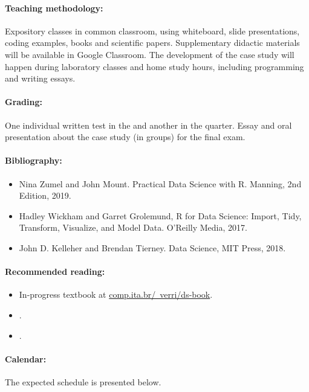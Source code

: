 \paragraph{Teaching methodology:}
Expository classes in common classroom, using whiteboard, slide presentations, coding
examples, books and scientific papers. Supplementary didactic materials will be available
in Google Classroom. The development of the case study will happen during laboratory
classes and home study hours, including programming and writing essays.

\paragraph{Grading:} One individual written test in the  and another in the  quarter.
Essay and oral presentation about the case study (in groups) for the final exam.

\newpage
\paragraph{Bibliography:}
\begin{itemize}
  \item Nina Zumel and John Mount. Practical Data Science with R. Manning, 2nd Edition, 2019.
  \item Hadley Wickham and Garret Grolemund, R for Data Science: Import, Tidy, Transform, Visualize, and Model Data. O’Reilly Media, 2017.
  \item John D. Kelleher and Brendan Tierney. Data Science, MIT Press, 2018.
\end{itemize}

\thispagestyle{empty}
\paragraph{Recommended reading:}
\begin{itemize}
  \item In-progress textbook at \href{https://comp.ita.br/~verri/ds-book}{comp.ita.br/~verri/ds-book}.
  \item {}.
  \item {}.
\end{itemize}

\paragraph{Calendar:} The expected schedule is presented below.
\thispagestyle{empty}

